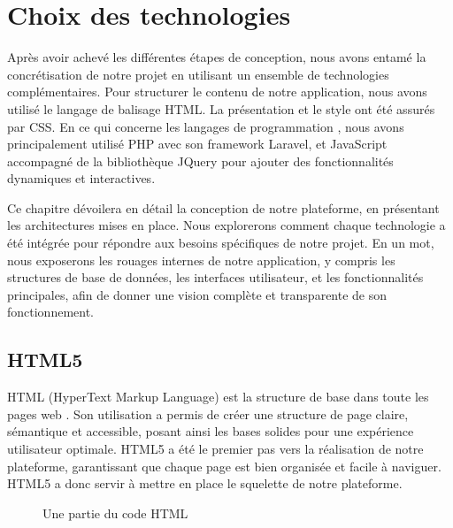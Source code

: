 \section{Choix des technologies}
Après avoir achevé les différentes étapes de conception, nous avons entamé la concrétisation de notre projet en utilisant un ensemble de technologies complémentaires. Pour structurer le contenu de notre application, nous avons utilisé le langage de balisage HTML. La présentation et le style ont été assurés par CSS. En ce qui concerne les langages de programmation , nous avons principalement utilisé PHP avec son framework Laravel, et JavaScript accompagné de la bibliothèque JQuery pour ajouter des fonctionnalités dynamiques et interactives. \par 

Ce chapitre dévoilera en détail la conception de notre plateforme, en présentant les architectures mises en place. Nous explorerons comment chaque technologie a été intégrée pour répondre aux besoins spécifiques de notre projet. En un mot, nous exposerons les rouages internes de notre application, y compris les structures de base de données, les interfaces utilisateur, et les fonctionnalités principales, afin de donner une vision complète et transparente de son fonctionnement.

\subsection{HTML5}
HTML (HyperText Markup Language) est la structure de base dans toute les pages web \cite{lubbers2011pro}.
Son utilisation a permis de créer une structure de page claire, sémantique et accessible, posant ainsi les bases solides pour une expérience utilisateur optimale. HTML5 a été le premier pas vers la réalisation de notre plateforme, garantissant que chaque page est bien organisée et facile à naviguer.
HTML5 a donc servir à mettre en place le squelette de notre plateforme.


\begin{figure}[H]%
    \center%
    \setlength{\fboxsep}{5pt}%
    \setlength{\fboxrule}{0.5pt}%
    \caption{Une partie du code HTML}%
\end{figure}

